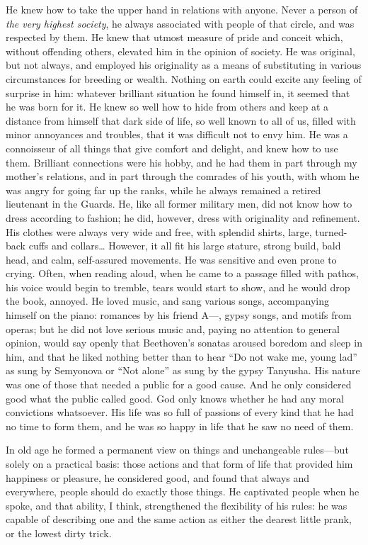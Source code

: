 He knew how to take the upper hand in relations with anyone. Never a person of \emph{the very highest society}, he always associated with people of that circle, and was respected by them. He knew that utmost measure of pride and conceit which, without offending others, elevated him in the opinion of society. He was original, but not always, and employed his originality as a means of substituting in various circumstances for breeding or wealth. Nothing on earth could excite any feeling of surprise in him: whatever brilliant situation he found himself in, it seemed that he was born for it. He knew so well how to hide from others and keep at a distance from himself that dark side of life, so well known to all of us, filled with minor annoyances and troubles, that it was difficult not to envy him. He was a connoisseur of all things that give comfort and delight, and knew how to use them. Brilliant connections were his hobby, and he had them in part through my mother's relations, and in part through the comrades of his youth, with whom he was angry for going far up the ranks, while he always remained a retired lieutenant in the Guards. He, like all former military men, did not know how to dress according to fashion; he did, however, dress with originality and refinement. His clothes were always very wide and free, with splendid shirts, large, turned-back cuffs and collars\ldots{} However, it all fit his large stature, strong build, bald head, and calm, self-assured movements. He was sensitive and even prone to crying. Often, when reading aloud, when he came to a passage filled with pathos, his voice would begin to tremble, tears would start to show, and he would drop the book, annoyed. He loved music, and sang various songs, accompanying himself on the piano: romances by his friend A---, gypsy songs, and motifs from operas; but he did not love serious music and, paying no attention to general opinion, would say openly that Beethoven's sonatas aroused boredom and sleep in him, and that he liked nothing better than to hear ``Do not wake me, young lad'' as sung by Semyonova or ``Not alone'' as sung by the gypsy Tanyusha. His nature was one of those that needed a public for a good cause.  And he only considered good what the public called good. God only knows whether he had any moral convictions whatsoever. His life was so full of passions of every kind that he had no time to form them, and he was so happy in life that he saw no need of them.

In old age he formed a permanent view on things and unchangeable rules---but solely on a practical basis: those actions and that form of life that provided him happiness or pleasure, he considered good, and found that always and everywhere, people should do exactly those things. He captivated people when he spoke, and that ability, I think, strengthened the flexibility of his rules: he was capable of describing one and the same action as either the dearest little prank, or the lowest dirty trick.

